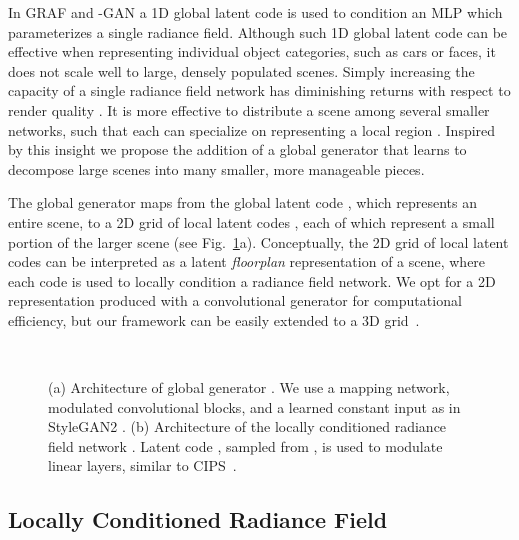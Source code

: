 \documentclass[10pt,twocolumn,letterpaper]{article}
\begin{document}
In GRAF \cite{graf} and -GAN \cite{pigan} a 1D global latent code  is used to condition an MLP which parameterizes a single radiance field. Although such 1D global latent code can be effective when representing individual object categories, such as cars or faces, it does not scale well to large, densely populated scenes. Simply increasing the capacity of a single radiance field network has diminishing returns with respect to render quality \cite{derf}. It is more effective to distribute a scene among several smaller networks, such that each can specialize on representing a local region \cite{derf}. Inspired by this insight we propose the addition of a global generator that learns to decompose large scenes into many smaller, more manageable pieces.

The global generator  maps from the global latent code , which represents an entire scene, to a 2D grid of local latent codes , each of which represent a small portion of the larger scene (see Fig.~\ref{fig:global_generator}a). Conceptually, the 2D grid of local latent codes can be interpreted as a latent \textit{floorplan} representation of a scene, where each code is used to locally condition a radiance field network. We opt for a 2D representation produced with a convolutional generator for computational efficiency, but our framework can be easily extended to a 3D grid~\cite{nsvf}. 

\begin{figure}[t]
    \centering
    \hspace{0.4cm}
    \\
    \vspace{0.3cm}
    \caption{(a) Architecture of global generator . We use a mapping network, modulated convolutional blocks, and a learned constant input as in StyleGAN2 \cite{stylegan2}. (b) Architecture of the locally conditioned radiance field network . Latent code , sampled from , is used to modulate linear layers, similar to CIPS~\cite{modfc}.}
    \label{fig:global_generator}
\end{figure}

\subsection{Locally Conditioned Radiance Field}\label{sec:local_radiance_fields}
\end{document}
